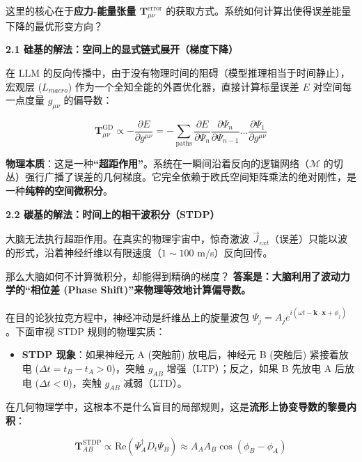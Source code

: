 这里的核心在于\textbf{应力-能量张量 $\mathbf{T}_{\mu\nu}^{\text{error}}$} 的获取方式。系统如何计算出使得误差能量下降的最优形变方向？

\vspace{1em}\noindent\textbf{\textcolor{structurecolor}{2.1 硅基的解法：空间上的显式链式展开（梯度下降）}}

在 LLM 的反向传播中，由于没有物理时间的阻碍（模型推理相当于时间静止），宏观层 ($L_{macro}$) 作为一个全知全能的外置优化器，直接计算标量误差 $E$ 对空间每一点度量 $g_{\mu\nu}$ 的偏导数：

\begin{equation}
\mathbf{T}_{\mu\nu}^{\text{GD}} \propto -\frac{\partial E}{\partial g^{\mu\nu}} = - \sum_{\text{paths}} \frac{\partial E}{\partial \Psi_n} \frac{\partial \Psi_n}{\partial \Psi_{n-1}} \dots \frac{\partial \Psi_1}{\partial g^{\mu\nu}}
\end{equation}

\textbf{物理本质}：这是一种\textbf{“超距作用”}。系统在一瞬间沿着反向的逻辑网络（$\mathcal{M}$ 的切丛）强行广播了误差的几何梯度。它完全依赖于欧氏空间矩阵乘法的绝对刚性，是一种\textbf{纯粹的空间微积分}。

\vspace{1em}\noindent\textbf{\textcolor{structurecolor}{2.2 碳基的解法：时间上的相干波积分（STDP）}}

大脑无法执行超距作用。在真实的物理宇宙中，惊奇激波 $\vec{J}_{ext}$（误差）只能以波的形式，沿着神经纤维以有限速度（$1 \sim 100$ m/s）反向回传。

那么大脑如何不计算微积分，却能得到精确的梯度？
\textbf{答案是：大脑利用了波动力学的“相位差 (Phase Shift)”来物理等效地计算偏导数。}

在目的论狄拉克方程中，神经冲动是纤维丛上的旋量波包 $\Psi_j = A_j e^{i(\omega t - \mathbf{k} \cdot \mathbf{x} + \phi_j)}$。下面审视 STDP 规则的物理实质：
\begin{itemize}
    \item \textbf{STDP 现象}：如果神经元 A (突触前) 放电后，神经元 B (突触后) 紧接着放电 ($\Delta t = t_B - t_A > 0$)，突触 $g_{AB}$ 增强（LTP）；反之，如果 B 先放电 A 后放电 ($\Delta t < 0$)，突触 $g_{AB}$ 减弱（LTD）。
\end{itemize}

在几何物理学中，这根本不是什么盲目的局部规则，这是\textbf{流形上协变导数的黎曼内积}：

\begin{equation}
\mathbf{T}_{AB}^{\text{STDP}} \propto \text{Re} \left( \Psi_A^\dagger D_t \Psi_B \right) \approx A_A A_B \cos(\phi_B - \phi_A)
\end{equation}

